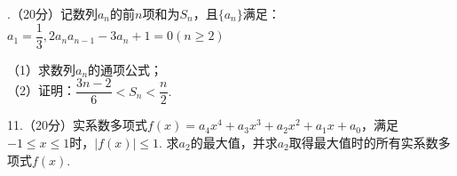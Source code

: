 .（20分）记数列${a_n}$的前$n$项和为$S_n$，且$\{ a_n \}$满足：
$a_1=\dfrac{1}{3},2a_na_{n-1}-3a_n+1=0(n\geq 2)$

（1）求数列${a_n}$的通项公式；
~\\

（2）证明：$\dfrac{3n-2}{6}<S_n<\dfrac{n}{2}.$

\vspace*{100mm}


11.（20分）实系数多项式$f(x)=a_4x^4+a_3x^3+a_2x^2+a_1x+a_0$，满足$-1\leq x \leq 1$时，$|f(x)|\leq 1$.
求$a_2$的最大值，并求$a_2$取得最大值时的所有实系数多项式$f(x)$.


